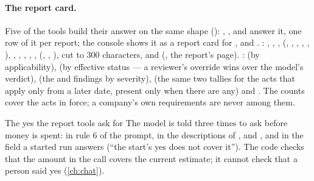 \paragraph{The report card.} Five of the tools build their answer on the same shape
(): , ,
 and  answer it,  one row of it per
report; the console shows it as a report card for ,
 and . : , , , 
(, , , , ,
), , , , ,
,  (, , ), 
cut to 300 characters, and  (, the report's page). :
 (by applicability),  (by effective status --- a reviewer's override
wins over the model's verdict),  (the  and 
findings by severity),  (the same two tallies for the acts that apply only
from a later date, present only when there are any) and . The counts cover the
acts in force; a company's own requirements are never among them.

\begin{humanbox}{The yes the report tools ask for}
The model is told three times to ask before money is spent: in rule 6 of the prompt, in the
descriptions of ,  and
, and in the  field a started run answers (\enquote{the
start's yes does not cover it}). The code checks that the amount in the call covers the
current estimate; it cannot check that a person said yes (\cref{ch:chat}).
\end{humanbox}

